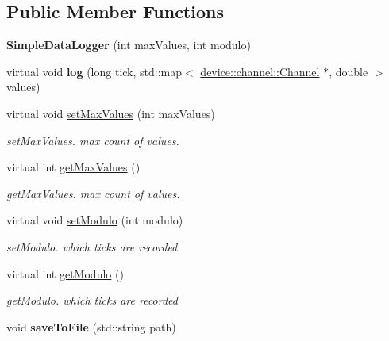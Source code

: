 \subsection*{Public Member Functions}
\begin{DoxyCompactItemize}
\item 
\hypertarget{classdrobot_1_1datalogger_1_1SimpleDataLogger_a71822d737ffde7309da5b18a0eb71e3c}{{\bfseries Simple\-Data\-Logger} (int max\-Values, int modulo)}\label{classdrobot_1_1datalogger_1_1SimpleDataLogger_a71822d737ffde7309da5b18a0eb71e3c}

\item 
\hypertarget{classdrobot_1_1datalogger_1_1SimpleDataLogger_a46f2d6161b81c808fb6b6c6c75b457fc}{virtual void {\bfseries log} (long tick, std\-::map$<$ \hyperlink{classdrobot_1_1device_1_1channel_1_1Channel}{device\-::channel\-::\-Channel} $\ast$, double $>$ values)}\label{classdrobot_1_1datalogger_1_1SimpleDataLogger_a46f2d6161b81c808fb6b6c6c75b457fc}

\item 
virtual void \hyperlink{classdrobot_1_1datalogger_1_1SimpleDataLogger_a8e79821846b2104d7f65e64f6e8a5eb6}{set\-Max\-Values} (int max\-Values)
\begin{DoxyCompactList}\small\item\em set\-Max\-Values. max count of values. \end{DoxyCompactList}\item 
virtual int \hyperlink{classdrobot_1_1datalogger_1_1SimpleDataLogger_a2b9a75d2f73bb22e6558166e9dbcc4f4}{get\-Max\-Values} ()
\begin{DoxyCompactList}\small\item\em get\-Max\-Values. max count of values. \end{DoxyCompactList}\item 
virtual void \hyperlink{classdrobot_1_1datalogger_1_1SimpleDataLogger_a4365669efc4d0950cf21c30be8650a88}{set\-Modulo} (int modulo)
\begin{DoxyCompactList}\small\item\em set\-Modulo. which ticks are recorded \end{DoxyCompactList}\item 
virtual int \hyperlink{classdrobot_1_1datalogger_1_1SimpleDataLogger_a43d243494d611d7f1c6afd5204686f40}{get\-Modulo} ()
\begin{DoxyCompactList}\small\item\em get\-Modulo. which ticks are recorded \end{DoxyCompactList}\item 
\hypertarget{classdrobot_1_1datalogger_1_1SimpleDataLogger_a37c5777c063826a05d6242c61fc454cf}{void {\bfseries save\-To\-File} (std\-::string path)}\label{classdrobot_1_1datalogger_1_1SimpleDataLogger_a37c5777c063826a05d6242c61fc454cf}


\end{DoxyCompactItemize}
